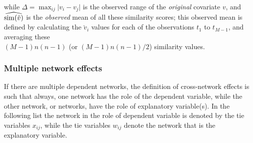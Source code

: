 \documentclass[a4paper,fleqn]{article}
\newcommand{\+}{\, + \,}
\newcommand{\vit}{\theenumi}
\newcommand{\SI}{{\sf SIENA }}
\begin{document}
{\begin{enumerate}
\[\]
 while
 $\Delta=\max_{ij}\vert v_i - v_j \vert$ is the observed range of the
 \emph{original} covariate $v$, and\\
 $\widehat{{\rm sim}(\breve v)}$ is the
 \emph{observed} mean of all these similarity scores;
 this observed mean is defined by calculating the $\breve v_i$ values
 for each of the observations $t_1$ to $t_{M-1}$, and averaging
 these \\
 $(M-1)n(n-1)$ (or $(M-1)n(n-1)/2$) similarity values.
\end{enumerate}

\subsubsection{Multiple network effects}
\label{S_MultiNet}

If there are multiple dependent networks, the definition of
cross-network effects is such that always, one network has the
role of the dependent variable, while the other network, or
networks, have the role of explanatory variable(s).
In the following list the network in the role of dependent variable
is denoted by the tie variables $x_{ij}$, while the
tie variables $w_{ij}$ denote the network that is the
explanatory variable.

}
\end{document}
